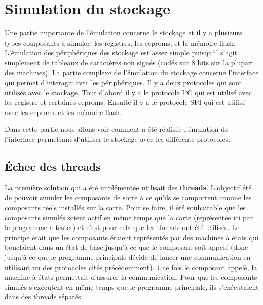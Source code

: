 \documentclass[a4paper]{article}
\begin{document}
\section{Simulation du stockage}

Une partie importante de l'émulation concerne le stockage et il y a plusieurs
types composants à simuler, les registres, les eeproms, et la mémoire flash.
L'émulation des périphériques des stockage est assez simple puisqu'il s'agit
simplement de tableaux de caractères non signés (codés sur 8 bits sur la plupart
des machines). La partie complexe de l'émulation du stockage concerne
l'interface qui permet d'interagir avec les périphériques. Il y a deux
protocoles qui sont utilisés avec le stockage. Tout d'abord il y a le protocole
I²C qui est utilisé avec les registre et certaines eeproms. Ensuite il y a le
protocole SPI qui est utilisé avec les eeproms et les mémoire flash.

Dans cette partie nous allons voir comment a été réalisée l'émulation de
l'interface permettant d'utiliser le stockage avec les différents protocoles.

\subsection{Échec des threads}

La première solution qui a été implémentée utilisait des \textbf{threads}.
L'objectif été de pouvoir simuler les composants de sorte à ce qu'ils se
comportent comme les composants réels installés sur la carte. Pour se faire, il
été souhaitable que les composants simulés soient actif en même temps que la
carte (représentée ici par le programme à tester) et c'est pour cela que les
threads ont été utilisés. Le principe était que les composants étaient
représentés par des machines à états qui bouclaient dans un état de base jusqu'à
ce que le composant soit appelé (donc jusqu'à ce que le programme principale
décide de lancer une communication en utilisant un des protocoles cités
précédemment). Une fois le composant appelé, la machine à états permettait
d'assurer la communication. Pour que les composants simulés s'exécutent en même
temps que le programme principale, ils s'exécutaient dans des threads séparés.
\\
\end{document}
